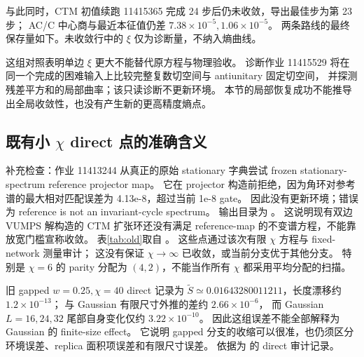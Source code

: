 \documentclass[11pt]{article}
\newcommand{\tS}{\widetilde S}
\begin{document}
与此同时，CTM 初值续跑 11415365 完成 24 步后仍未收敛，导出最佳步为第 23 步；
AC/C 中心商与最近本征值仍差 $7.38\times10^{-5},1.06\times10^{-5}$。
两条路线的最终保存量如下。未收敛行中的 $\xi$ 仅为诊断量，不纳入熵曲线。
\begin{center}\small

\end{center}
这组对照表明单边 $\xi$ 更大不能替代原方程与物理验收。
诊断作业 11415529 将在同一个完成的困难输入上比较完整复数切空间与 antiunitary 固定切空间，
并探测残差平方和的局部曲率；该只读诊断不更新环境。
本节的局部恢复成功不能推导出全局收敛性，也没有产生新的更高精度熵点。

\subsection{既有小 \texorpdfstring{$\chi$}{χ} direct 点的准确含义}

补充检查：作业 11413244 从真正的原始 stationary 字典尝试 frozen stationary-spectrum reference projector map。
它在 projector 构造前拒绝，因为角环对参考谱的最大相对匹配误差为 4.13e-8，超过当前 1e-8 gate。
因此没有更新环境；错误为 reference is not an invariant-cycle spectrum。
输出目录为 。
这说明现有双边 VUMPS 解构造的 CTM 扩张环还没有满足 reference-map 的不变谱方程，不能靠放宽门槛宣称收敛。
表\ref{tab:old}取自 。
这些点通过该次有限 $\chi$ 方程与 fixed-network 测量审计；
这没有保证 $\chi\to\infty$ 已收敛，或当前分支优于其他分支。
特别是 $\chi=6$ 的 parity 分配为 $(4,2)$，不能当作所有 $\chi$ 都采用平均分配的扫描。
\begin{table}[htbp]\centering\scriptsize

\caption{既有有限 $\chi$ 参考值，$w=1$。最后一列为原方程残差；
新 MP-BP 候选没有覆盖这些点。两侧 self $\xi$ 在这些报告中数值接近，此处列右侧。}
\label{tab:old}
\end{table}

旧 gapped $w=0.25,\chi=40$ direct 记录为
$\tS\simeq0.01643280011211$，长度漂移约 $1.2\times10^{-13}$；
与 Gaussian 有限尺寸外推的差约 $2.66\times10^{-6}$，
而 Gaussian $L=16,24,32$ 尾部自身变化仅约 $3.22\times10^{-10}$。
因此这组误差不能全部解释为 Gaussian 的 finite-size effect。
它说明 gapped 分支的收缩可以很准，也仍须区分环境误差、replica 面积项误差和有限尺寸误差。
依据为  的 direct 审计记录。
\end{document}
